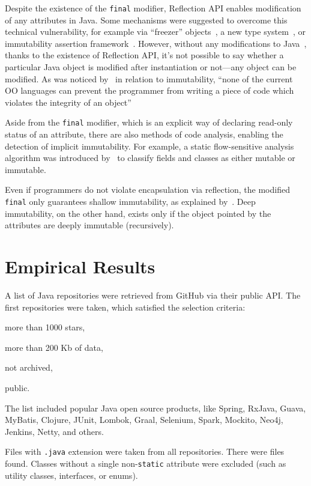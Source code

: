 \documentclass[12pt]{article}
\begin{document}
Despite the existence of the \texttt{final} modifier, Reflection API enables
modification of any attributes in Java. Some mechanisms were suggested to
overcome this technical vulnerability, for example
via ``freezer'' objects~\cite{leino2008},
a new type system~\cite{tschantz2005},
or immutability assertion framework~\cite{pechtchanski2005}.
However, without any modifications to Java~\cite{steele2005},
thanks to the existence of Reflection API,
it's not possible to say whether a particular Java object is modified
after instantiation or not---any object can be modified. As was noticed
by~\cite{hakonen1999} in relation to immutability,
``none of the current OO languages can prevent the programmer from writing
a piece of code which violates the integrity of an object''

Aside from the \texttt{final} modifier, which is an explicit way of declaring
read-only status of an attribute, there are also methods of
code analysis, enabling the detection of implicit immutability. For example,
a static flow-sensitive analysis algorithm was introduced by~\cite{porat2000}
to classify fields and classes as either mutable or immutable.

Even if programmers do not violate encapsulation via reflection, the
modified \texttt{final} only guarantees shallow immutability, as
explained by~\cite{hakonen1999}. Deep immutability, on the other hand,
exists only if the object pointed by the attributes are deeply immutable
(recursively).

\section{Empirical Results}

A list of Java repositories were retrieved from GitHub via their
public API. The first \totalrepos{} repositories were taken, which satisfied
the selection criteria:
\begin{enumerate*}[label={\arabic*)}]
\item more than 1000 stars,
\item more than 200 Kb of data,
\item not archived,
\item public.
\end{enumerate*}
The list included popular Java open source products, like
Spring, RxJava, Guava, MyBatis, Clojure, JUnit, Lombok,
Graal, Selenium, Spark, Mockito, Neo4j, Jenkins, Netty, and others.

Files with \texttt{.java} extension were taken from all repositories.
There were \totaljavafiles{} files found. Classes without a single
non-\texttt{static} attribute were excluded (such as utility classes,
interfaces, or enums).
\end{document}
